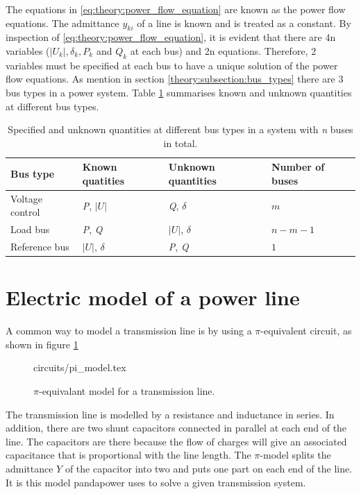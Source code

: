 \documentclass[class=book, crop=false]{standalone}
\begin{document}
The equations in \eqref{eq:theory:power_flow_equation} are known as the power flow equations. The admittance $y_{ki}$ of a line is known and is treated as a constant. By inspection of \eqref{eq:theory:power_flow_equation}, it is evident that there are 4n variables ($|U_{k}|,\delta_{k}, P_{k}$ and $Q_{k}$ at each bus) and 2n equations. Therefore, 2 variables must be specified at each bus to have a unique solution of the power flow equations. 
As mention in section \ref{theory:subsection:bus_types} there are 3 bus types in a power system. Table \ref{table:bus_types} summarises known and unknown quantities at different bus types.


\begin{table}[h]
\centering
\caption{Specified and unknown quantities at different bus types in a system with \textit{n} buses in total. }
\label{table:bus_types}
\begin{tabular}{l|lll}

Bus type  & Known quatities   & Unknown quantities & Number of buses \\ \hline
Voltage control      & \textit{P}, $|U|$   &  \textit{Q}, $\delta$ & $m$   \\ 
Load bus    & \textit{P}, \textit{Q}    & $|U|$, $\delta$ & $n-m-1$ \\ 
Reference bus & $|U|$, $\delta$ & \textit{P}, \textit{Q}  & $1$ \\ \hline
\end{tabular}
\end{table}




\section{Electric model of a power line}\label{section:pi_model}
A common way to model a transmission line is by using a $\pi$-equivalent circuit, as shown in figure \ref{fig:theory:PI_model}

\begin{figure}[ht!]
    \center
    {circuits/pi_model.tex}
    \caption{$\pi$-equivalant model for a transmission line.}
    \label{fig:theory:PI_model}
\end{figure}

The transmission line is modelled by a resistance and inductance in series. In addition, there are two shunt capacitors connected in parallel at each end of the line. The capacitors are there because the flow of charges will give an associated capacitance that is proportional with the line length. The $\pi$-model splits the admittance $Y$ of the capacitor into two and puts one part on each end of the line. It is this model pandapower uses to solve a given transmission system. 
\end{document}
